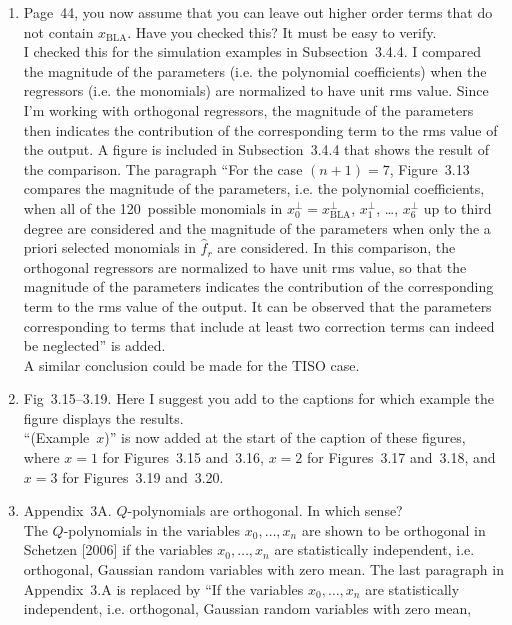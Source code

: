 \documentclass{article}
\newenvironment{answer}{\noindent\ignorespaces\color{blue}}{\noindent\ignorespacesafterend}
\newcommand{\ans}[1]{\begin{answer}#1\end{answer}}
\newcommand{\oldnewpage}[2]{\marginpar{{\color{black}#1} / {\color{red}#2}}}
\begin{document}
\begin{enumerate}
	\item Page~44, you now assume that you can leave out higher order terms that do not contain $x_\mathrm{BLA}$. Have you checked this? It must be easy to verify.\\
		\ans{\oldnewpage{44 and~51}{48, 55 and~57}I checked this for the simulation examples in Subsection~3.4.4. I compared the magnitude of the parameters (i.e. the polynomial coefficients) when the regressors (i.e. the monomials) are normalized to have unit rms value. Since I'm working with orthogonal regressors, the magnitude of the parameters then indicates the contribution of the corresponding term to the rms value of the output.
			A figure is included in Subsection~3.4.4 that shows the result of the comparison. The paragraph ``For the case \mbox{$(n+1)=7$}, Figure~3.13 compares the magnitude of the parameters, i.e. the polynomial coefficients, when all of the 120~possible monomials in \mbox{$x_0^{\perp} = x_\mathrm{BLA}^{\perp}$}, $x_1^\perp$, \ldots, $x_6^\perp$ up to third degree are considered and the magnitude of the parameters when only the a priori selected monomials in $\hat{f}_r$ are considered. In this comparison, the orthogonal regressors are normalized to have unit rms value, so that the magnitude of the parameters indicates the contribution of the corresponding term to the rms value of the output. It can be observed that the parameters corresponding to terms that include at least two correction terms can indeed be neglected'' is added.\\
			A similar conclusion could be made for the TISO case.}
	\item Fig~3.15--3.19. Here I suggest you add to the captions for which example the figure displays the results.\\
		\ans{\oldnewpage{60--64}{66--69}``(Example~$x$)'' is now added at the start of the caption of these figures, where $x=1$ for Figures~3.15 and~3.16, $x=2$ for Figures~3.17 and~3.18, and $x=3$ for Figures~3.19 and~3.20.}
	\item {Appendix~3A. $Q$-polynomials are orthogonal. In which sense?}\\
		\ans{\oldnewpage{66}{71}The $Q$-polynomials in the variables $x_0, \ldots, x_n$ are shown to be orthogonal in Schetzen [2006] if the variables $x_0, \ldots, x_n$ are statistically independent, i.e. orthogonal, Gaussian random variables with zero mean. The last paragraph in Appendix~3.A is replaced by ``If the variables \mbox{$x_0, \ldots, x_n$} are statistically independent, i.e. orthogonal, Gaussian random variables with zero mean,
}
\end{enumerate}
\end{document}
